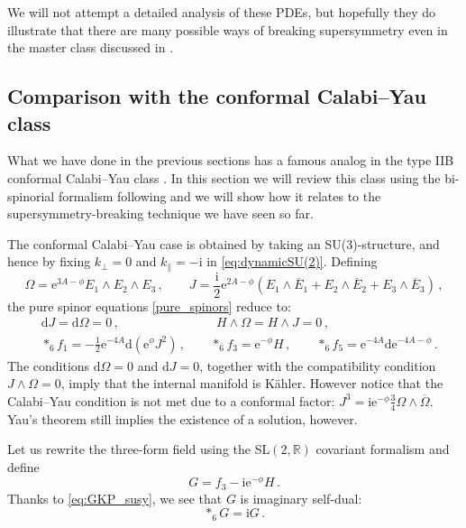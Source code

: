 \documentclass[12pt]{article}
\newcommand{\R}{\mathbb{R}}
\newcommand{\dd}{\mathrm{d}}
\newcommand{\e}{\mathrm{e}}
\newcommand{\ii}{\mathrm{i}}
\begin{document}
We will not attempt a detailed analysis of these PDEs, but hopefully they do illustrate that there are many possible ways of breaking supersymmetry even in the master class discussed in \cite[App.~C]{macpherson-t}.



\subsection{Comparison with the conformal Calabi--Yau class} \label{sub:gkp}

What we have done in the previous sections has a famous analog in the type IIB conformal Calabi--Yau class \cite{grana-polchinski,giddings-kachru-polchinski,becker2,dasgupta-rajesh-sethi}. In this section we will review this class using the bi-spinorial formalism following \cite{lust-marchesano-martucci-tsimpis} and we will show how it relates to the supersymmetry-breaking technique we have seen so far.

The conformal Calabi--Yau case is obtained by taking an SU(3)-structure, and hence by fixing $k_\perp = 0$ and $k_\parallel= - \ii$ in \eqref{eq:dynamicSU(2)}. Defining  
\begin{equation}
\label{eq:conformal_structures def}
\Omega = \e^{3A - \phi} E_1 \wedge E_2 \wedge E_3 \, , \qquad J = \frac{\ii}{2} \e^{2A - \phi} \left( E_1 \wedge \overline{E}_1 +  E_2 \wedge \overline{E}_2 +  E_3 \wedge \overline{E}_3\right) \, ,
\end{equation}
the pure spinor equations \eqref{pure_spinors} reduce to:
\begin{equation}
\label{eq:GKP_susy}
\begin{split}
&\dd J = \dd \Omega = 0 \, , \qquad \qquad \qquad \quad \, \, \, \, H \wedge \Omega = H \wedge J = 0 \, , \\
& *_6 f_1 = - \frac{1}{2} \e^{-4A} \dd (\e^{\phi} J^2) \, , \qquad *_6 f_3 = \e^{-\phi} H \, , \qquad *_6 f_5 = \e^{-4A} \dd \e^{-4A-\phi} \, .
\end{split}
\end{equation}
The conditions $\dd \Omega = 0$ and $\dd J = 0$, together with the compatibility condition $J \wedge \Omega = 0$, imply that the internal manifold is K\"ahler. However notice that the Calabi--Yau condition is not met due to a conformal factor: $J^3 = \ii \e^{-\phi} \frac{3}{4} \Omega \wedge \overline \Omega$. Yau's theorem still implies the existence of a solution, however.

Let us rewrite the three-form field using the SL$(2,\R)$ covariant formalism and define
\begin{equation}
G = f_3 - \ii \e^{-\phi} H \, .
\end{equation}
Thanks to \eqref{eq:GKP_susy}, we see that $G$ is imaginary self-dual:
\begin{equation}
\label{eq:GKP self}
*_6 G = \ii G \, .
\end{equation}
\end{document}
